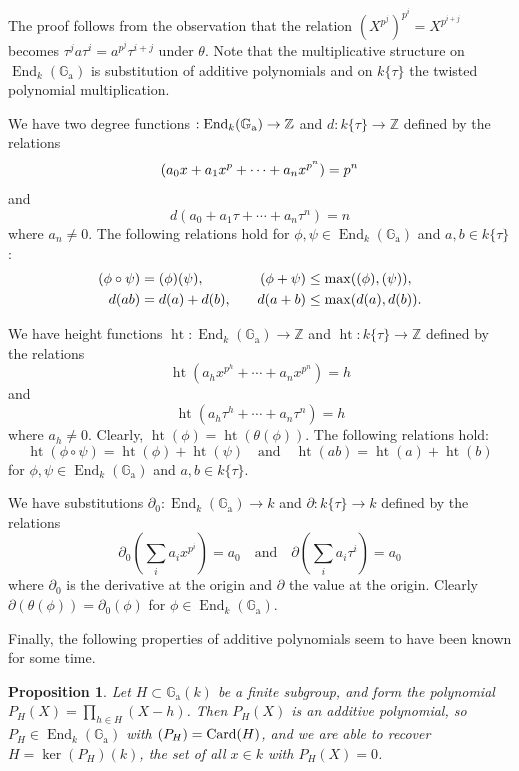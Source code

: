 \documentclass[12pt,a4paper]{article}
\theoremstyle{plain}
\newtheorem{proposition}{Proposition}[section]
\theoremstyle{definition}
\theoremstyle{remark}
\DeclareMathOperator{\End}{End}
\DeclareMathOperator{\Card}{Card}
\DeclareMathOperator{\htop}{ht}
\newcommand{\bZ}{\mathbb{Z}}
\newcommand{\Ga}{\mathbb{G}_\mathrm{a}}
\let\deg\relax
\providecommand{\Ga}{\mathbb{G}_{\mathrm a}}
\providecommand{\End}{\operatorname{End}}
\begin{document}
The proof follows from the observation that the relation $(X^{p^j})^{p^i} = X^{p^{i+j}}$ becomes $\tau^j a \tau^i = a^{p^j} \tau^{i+j}$ under $\theta$. Note that the multiplicative structure on $\End_k(\Ga)$ is substitution of additive polynomials and on $k\{\tau\}$ the twisted polynomial multiplication.

We have two degree functions $\deg: \End_k(\Ga) \to \bZ$ and $d: k\{\tau\} \to \bZ$ defined by the relations
\[
\deg(a_0 x + a_1 x^p + \cdots + a_n x^{p^n}) = p^n
\]
and
\[
d(a_0 + a_1 \tau + \cdots + a_n \tau^n) = n
\]
where $a_n \neq 0$. The following relations hold for $\phi, \psi \in \End_k(\Ga)$ and $a, b \in k\{\tau\}$:
\begin{align*}
\deg(\phi \circ \psi) &= \deg(\phi) \deg(\psi), &\quad \deg(\phi + \psi) &\leq \max(\deg(\phi), \deg(\psi)), \\
d(ab) &= d(a) + d(b), &\quad d(a+b) &\leq \max(d(a), d(b)).
\end{align*}

We have height functions $\htop: \End_k(\Ga) \to \bZ$ and $\htop: k\{\tau\} \to \bZ$ defined by the relations
\[
\htop(a_h x^{p^h} + \cdots + a_n x^{p^n}) = h
\]
and
\[
\htop(a_h \tau^h + \cdots + a_n \tau^n) = h
\]
where $a_h \neq 0$. Clearly, $\htop(\phi) = \htop(\theta(\phi))$. The following relations hold:
\[
\htop(\phi \circ \psi) = \htop(\phi) + \htop(\psi) \quad \text{and} \quad \htop(ab) = \htop(a) + \htop(b)
\]
for $\phi, \psi \in \End_k(\Ga)$ and $a, b \in k\{\tau\}$.

We have substitutions $\partial_0: \End_k(\Ga) \to k$ and $\partial: k\{\tau\} \to k$ defined by the relations
\[
\partial_0\left(\sum_i a_i x^{p^i}\right) = a_0 \quad \text{and} \quad \partial\left(\sum_i a_i \tau^i\right) = a_0
\]
where $\partial_0$ is the derivative at the origin and $\partial$ the value at the origin. Clearly $\partial(\theta(\phi)) = \partial_0(\phi)$ for $\phi \in \End_k(\Ga)$.

Finally, the following properties of additive polynomials seem to have been known for some time.

\begin{proposition}
\label{prop:additive}
Let $H \subset \Ga(k)$ be a finite subgroup, and form the polynomial $P_H(X) = \prod_{h \in H} (X - h)$. Then $P_H(X)$ is an additive polynomial, so $P_H \in \End_k(\Ga)$ with $\deg(P_H) = \Card(H)$, and we are able to recover $H = \ker(P_H)(k)$, the set of all $x \in k$ with $P_H(X) = 0$.
\end{proposition}
\end{document}
